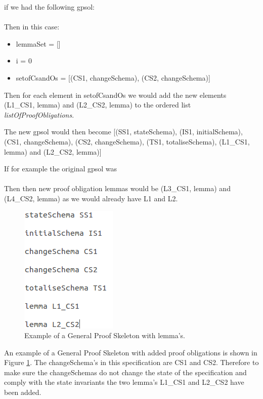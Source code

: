 if we had the following \gls{gpsol}: \\
 \\
Then in this case:
\begin{itemize}
\item lemmaSet = []
\item i = 0
\item setofCsandOs = [(CS1, changeSchema), (CS2, changeSchema)]
\end{itemize}

Then for each element in setofCsandOs we would add the new elements (L1\_CS1, lemma) and (L2\_CS2, lemma) to the ordered list \emph{listOfProofObligations}.

The new \gls{gpsol} would then become [(SS1, stateSchema), (IS1, initialSchema), (CS1, changeSchema), (CS2, changeSchema), (TS1, totaliseSchema), (L1\_CS1, lemma) and (L2\_CS2, lemma)]

If for example the original \gls{gpsol} was \\
\\
Then then new proof obligation lemmas would be (L3\_CS1, lemma) and (L4\_CS2, lemma) as we would already have L1 and L2.

\begin{figure}[H]
\centering
\includegraphics[scale=0.5]{Figures/skeleton/proofskeletonwithpo.png}
\caption{Example of a General Proof Skeleton with lemma's.}
\label{fig:gpswithpo}
\end{figure}

An example of a General Proof Skeleton with added proof obligations is shown in Figure \ref{fig:gpswithpo}. The changeSchema's in this specification are CS1 and CS2. Therefore to make sure the changeSchemas do not change the state of the specification and comply with the state invariants the two lemma's L1\_CS1 and L2\_CS2 have been added.

